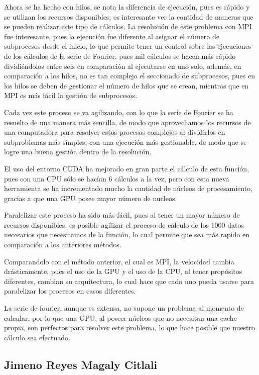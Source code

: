 Ahora se ha hecho con hilos, se nota la diferencia de ejecución, pues es rápido y se utilizan los recursos disponibles, es interesante ver la cantidad de maneras que se pueden realizar este tipo de cálculos.
La resolución de este problema con MPI fue interesante, pues la ejecución fue diferente al asignar el número de subprocesos desde el inicio, lo que permite tener un control sobre las ejecuciones de los cálculos de la serie de Fourier, pues mil cálculos se hacen más rápido dividiéndolos entre seis en comparación al ejecutarse en uno solo, además, en comparación a los hilos, no es tan complejo el seccionado de subprocesos, pues en los hilos se deben de gestionar el número de hilos que se crean, mientras que en MPI es más fácil la gestión de subprocesos. 

Cada vez este proceso se va agilizando, con lo que la serie de Fourier se ha resuelto de una manera más sencilla, de modo que aprovechamos los recursos de una computadora para resolver estos procesos complejos al dividirlos en subproblemas más simples, con una ejecución más gestionable, de modo que se logre una buena gestión dentro de la resolución.

El uso del entorno CUDA ha mejorado en gran parte el cálculo de esta función, pues con una CPU sólo se hacían 6 cálculos a la vez, pero con esta nueva herramienta se ha incrementado mucho la cantidad de núcleos de procesamiento, gracias a que una GPU posee mayor número de nucleos.

Paralelizar este proceso ha sido más fácil, pues al tener un mayor número de recursos disponibles, es posible agilizar el proceso de cálculo de los 1000 datos necesarios que necesitamos de la función, lo cual permite que sea más rapido en comparación a los anteriores métodos.

Comparandolo con el método anterior, el cual es MPI, la velocidad cambia drásticamente, pues el uso de la GPU y el uso de la CPU, al tener propósitos diferentes, cambian su arquitectura, lo cual hace que cada uno pueda usarse para paralelizar los procesos en casos diferentes.

La serie de fourier, aunque es extensa, no supone un problema al momento de calcular, por lo que una GPU, al poseer núcleos que no necesitan una cache propia, son perfectos para resolver este problema, lo que hace posible que nuestro cálculo sea efectuado.
\subsection{Jimeno Reyes Magaly Citlali }

